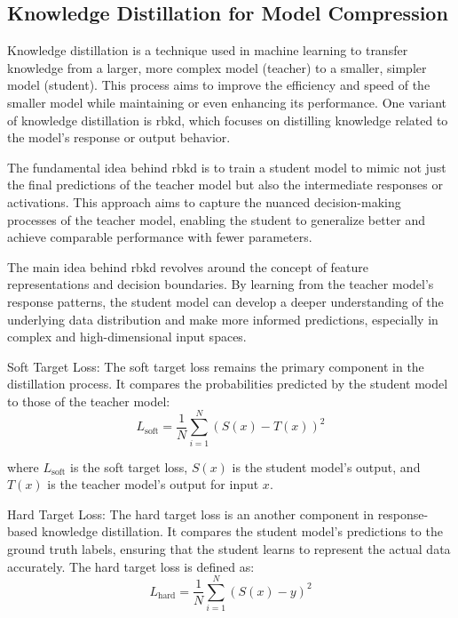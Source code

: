     \subsection{Knowledge Distillation for Model Compression}
    Knowledge distillation is a technique used in machine learning to transfer knowledge from a larger, more complex model (teacher) to a smaller, simpler model (student). This process aims to improve the efficiency and speed of the smaller model while maintaining or even enhancing its performance. One variant of knowledge distillation is \gls{rbkd}, which focuses on distilling knowledge related to the model's response or output behavior.

    The fundamental idea behind \gls{rbkd} is to train a student model to mimic not just the final predictions of the teacher model but also the intermediate responses or activations. This approach aims to capture the nuanced decision-making processes of the teacher model, enabling the student to generalize better and achieve comparable performance with fewer parameters.
    
    The main idea behind \gls{rbkd} revolves around the concept of feature representations and decision boundaries. By learning from the teacher model's response patterns, the student model can develop a deeper understanding of the underlying data distribution and make more informed predictions, especially in complex and high-dimensional input spaces.
    
    
    Soft Target Loss:
    The soft target loss remains the primary component in the distillation process. It compares the probabilities predicted by the student model to those of the teacher model:
    \begin{equation}
        L_{\text{soft}} = \frac{1}{N} \sum_{i=1}^{N} \left( S(x) - T(x)\right)^2
    \end{equation}
    
    where $L_{\text{soft}}$ is the soft target loss, $S(x)$ is the student model's output, and $T(x)$ is the teacher model's output for input $x$.

    Hard Target Loss:
    The hard target loss is an another component in response-based knowledge distillation. It compares the student model's predictions to the ground truth labels, ensuring that the student learns to represent the actual data accurately. The hard target loss is defined as:
    \begin{equation}
        L_{\text{hard}} = \frac{1}{N} \sum_{i=1}^{N} \left( S(x) - y\right)^2
    \end{equation}    
    
